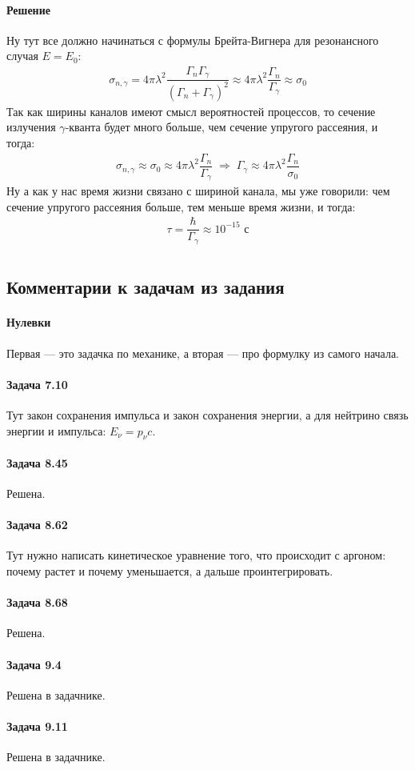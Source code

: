 \documentclass[12pt]{article}
\begin{document}
\paragraph{Решение}
Ну тут все должно начинаться с формулы Брейта-Вигнера для резонансного случая $E = E_0$:
\begin{gather*}
    \sigma_{n, \gamma} = 4\pi \lambda^2 \dfrac{\Gamma_n \Gamma_{\gamma}}{(\Gamma_n +\Gamma_{\gamma})^2} \approx 4\pi \lambda^2 \dfrac{\Gamma_n}{\Gamma_{\gamma}} \approx \sigma_0
\end{gather*}
Так как ширины каналов имеют смысл вероятностей процессов, то сечение излучения $\gamma$-кванта будет много больше, чем сечение упругого рассеяния, и тогда:
\begin{gather*}
    \sigma_{n, \gamma}  \approx \sigma_0 \approx 4\pi \lambda^2 \dfrac{\Gamma_n}{\Gamma_{\gamma}} \;\Rightarrow\; \Gamma_{\gamma} \approx  4\pi \lambda^2 \dfrac{\Gamma_n}{\sigma_0}
\end{gather*}
Ну а как у нас время жизни связано с шириной канала, мы уже говорили: чем сечение упругого рассеяния больше, тем меньше время жизни, и тогда:
\begin{gather*}
    \tau = \dfrac{\hbar}{\Gamma_{\gamma}} \approx 10^{-15} \text{ с}\\
\end{gather*}


\subsection{Комментарии к задачам из задания}
\paragraph{Нулевки} Первая --- это задачка по механике, а вторая --- про формулку из самого начала.
\paragraph{Задача 7.10} Тут закон сохранения импульса и закон сохранения энергии, а для нейтрино связь энергии и импульса: $E_{\nu} = p_{\nu}c$.
\paragraph{Задача 8.45} Решена.
\paragraph{Задача 8.62} Тут нужно написать кинетическое уравнение того, что происходит с аргоном: почему растет и почему уменьшается, а дальше проинтегрировать. 
\paragraph{Задача 8.68} Решена.
\paragraph{Задача 9.4} Решена в задачнике.
\paragraph{Задача 9.11} Решена в задачнике.
\end{document}
